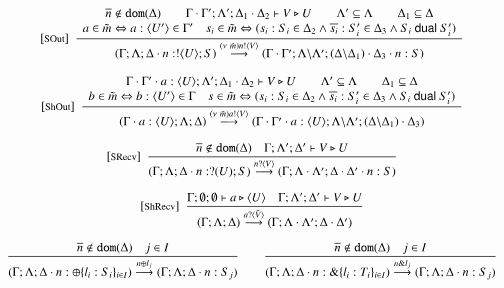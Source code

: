\begin{figure}
	\[
	\begin{array}{c}
		{\footnotesize [\textrm{SOut}]}~~\displaystyle \frac { 
			\begin{array}{c}
				\overline{n} \notin \mathtt{dom}(\Delta)
				\qquad 
				\Gamma \cdot \Gamma'; \Lambda'; \Delta_1 \cdot \Delta_2 \vdash V \triangleright U
				\qquad
				\Lambda' \subseteq \Lambda
				\qquad
				\Delta_1 \subseteq \Delta\\
				a \in \tilde{m} \Leftrightarrow a: \langle U' \rangle \in \Gamma' \quad
				s_i \in \tilde{m} \Leftrightarrow (s_i: S_i \in \Delta_2 \wedge \overline{s_i}: S'_i \in \Delta_3 \wedge S_i \ \mathsf{dual}\  S'_i)
			\end{array}
		 }{ 
			(\Gamma; \Lambda; \Delta \cdot n: ! \langle U \rangle ; S) \stackrel{(\nu\ \tilde{m}) n ! \langle V \rangle}{\longrightarrow} (\Gamma \cdot \Gamma'; \Lambda\backslash\Lambda'; (\Delta\backslash\Delta_1) \cdot \Delta_3 \cdot n: S)			
		 } 
		\\[8mm]

		{\footnotesize [\textrm{ShOut}]}~~\displaystyle \frac { 
			\begin{array}{c}
				\Gamma \cdot \Gamma' \cdot a: \langle U \rangle; \Lambda'; \Delta_1 \cdot \Delta_2 \vdash V \triangleright U
				\qquad
				\Lambda' \subseteq \Lambda
				\qquad
				\Delta_1 \subseteq \Delta\\
				b \in \tilde{m} \Leftrightarrow b: \langle U' \rangle \in \Gamma \quad
				s \in \tilde{m} \Leftrightarrow (s_i: S_i \in \Delta_2 \wedge \overline{s_i}: S'_i \in \Delta_3 \wedge S_i \ \mathsf{dual}\  S'_i)
			\end{array}
		 }{ 
			(\Gamma\cdot a: \langle U \rangle; \Lambda; \Delta) \stackrel{(\nu\ \tilde{m}) a ! \langle V \rangle}{\longrightarrow} (\Gamma \cdot \Gamma'\cdot a: \langle U \rangle; \Lambda\backslash\Lambda'; (\Delta\backslash\Delta_1) \cdot \Delta_3)			
		 } 
		\\[8mm]


		{\footnotesize [\textrm{SRecv}]}~~\displaystyle \frac { 
			\overline{n} \notin \mathtt{dom}(\Delta) \quad \Gamma; \Lambda'; \Delta' \vdash V \triangleright U
		 }{ 
			(\Gamma; \Lambda; \Delta \cdot n: ? (U) ; S) \stackrel{n ? \langle V \rangle}{\longrightarrow} (\Gamma; \Lambda\cdot\Lambda'; \Delta\cdot\Delta' \cdot n: S)
		 } 
		\\[8mm]

		{\footnotesize [\textrm{ShRecv}]}~~\displaystyle \frac { 
			\Gamma; \emptyset; \emptyset \vdash a \triangleright \langle U \rangle
			\quad
			\Gamma; \Lambda'; \Delta' \vdash V \triangleright U
		 }{ 
			(\Gamma; \Lambda; \Delta) \stackrel{a ? \langle \tilde{V} \rangle}{\longrightarrow} (\Gamma; \Lambda\cdot\Lambda'; \Delta\cdot\Delta')
		 } 
		\\[8mm]

		\displaystyle \frac { 
			\overline{n} \notin \mathtt{dom}(\Delta) \quad j \in I
		 }{ 
			(\Gamma; \Lambda; \Delta \cdot n: \oplus \{l_i: S_i\}_{i \in I}) \stackrel{n \oplus l_j}{\longrightarrow} (\Gamma; \Lambda; \Delta \cdot n:S_j)
		 } 
		\qquad
		\displaystyle \frac { 
			\overline{n} \notin \mathtt{dom}(\Delta) \quad j \in I
		 }{ 
			(\Gamma; \Lambda; \Delta \cdot n: \& \{l_i: T_i\}_{i \in I}) \stackrel{n \& l_j}{\longrightarrow} (\Gamma; \Lambda; \Delta \cdot n:S_j)
		 } 
		\\[8mm]


\end{array}\]
\end{figure}
